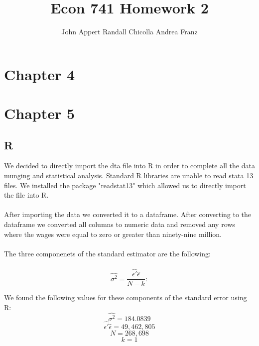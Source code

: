 \documentclass{article}
\begin{document}
\title{Econ 741 Homework 2}
\author{John Appert Randall Chicolla Andrea Franz}
\maketitle

\section{Chapter 4}

\section{Chapter 5}

\subsection{R}

We decided to directly import the dta file into R in order to complete all the data munging and statistical analysis.  Standard R libraries are unable to read stata 13 files.  We installed the package "readstat13" which allowed us to directly import the file into R.
\\
\\
After importing the data we converted it to a dataframe.  After converting to the dataframe we converted all columns to numeric data and removed any rows where the wages were equal to zero or greater than ninety-nine million.  
\\
\\
The three componenets of the standard estimator are the following:
\\
\\

\begin{equation}
\hat{\sigma^2}=\frac{\hat{\epsilon'} \hat{\epsilon}}{N-k}:
\end{equation}

We found the following values for these components of the standard error using R:
\\
\begin{equation}
\hat{\sigma^2}=184.0839
\end{equation}
\begin{equation}
\hat{\epsilon'}\hat{\epsilon}=49,462,805
\end{equation}
\begin{equation}
N=268,698
\end{equation}
\begin{equation}
k=1
\end{equation}
\end{document}
